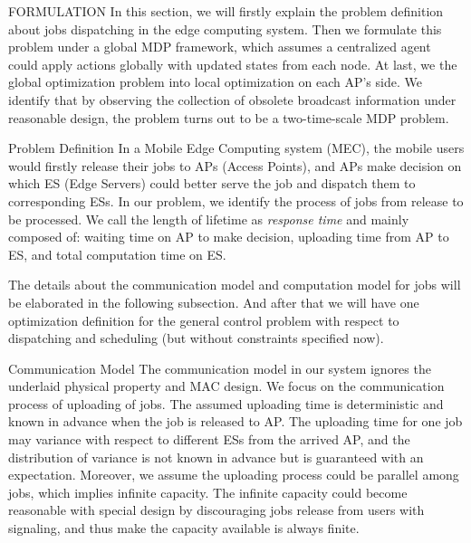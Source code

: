 \documentclass[10pt, conference, letterpaper]{IEEEtran}
\begin{document}
    \begin{section}{FORMULATION}
        \label{sec:formulation}
        In this section, we will firstly explain the problem definition about jobs dispatching in the edge computing system. Then we formulate this problem under a global MDP framework, which assumes a centralized agent could apply actions globally with updated states from each node. At last, we the global optimization problem into local optimization on each AP's side. We identify that by observing the collection of obsolete broadcast information under reasonable design, the problem turns out to be a two-time-scale MDP problem.

        \begin{subsection}{Problem Definition}
            In a Mobile Edge Computing system (MEC), the mobile users would firstly release their jobs to APs (Access Points), and APs make decision on which ES (Edge Servers) could better serve the job and dispatch them to corresponding ESs.
            In our problem, we identify the process of jobs from release to be processed. We call the length of lifetime as \emph{response time} and mainly composed of: waiting time on AP to make decision, uploading time from AP to ES, and total computation time on ES.
            
            The details about the communication model and computation model for jobs will be elaborated in the following subsection. And after that we will have one optimization definition for the general control problem with respect to dispatching and scheduling (but without constraints specified now).

            \begin{subsubsection}{Communication Model}
                The communication model in our system ignores the underlaid physical property and MAC design. We focus on the communication process of uploading of jobs.
                The assumed uploading time is deterministic and known in advance when the job is released to AP. The uploading time for one job may variance with respect to different ESs from the arrived AP, and the distribution of variance is not known in advance but is guaranteed with an expectation.
                Moreover, we assume the uploading process could be parallel among jobs, which implies infinite capacity. The infinite capacity could become reasonable with special design by discouraging jobs release from users with signaling, and thus make the capacity available is always finite.


\end{subsubsection}
\end{subsection}
\end{section}
\end{document}

